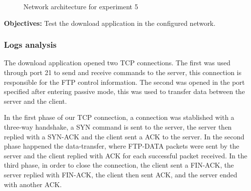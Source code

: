 \documentclass[a4paper, 11pt]{report}
\begin{document}
\begin{figure}[H]
	\caption{Network architecture for experiment 5}
	\label{fig:network_exp4}
\end{figure}

\textbf{Objectives:} Test the download application in the configured network.

\subsubsection{Logs analysis} \label{sec:Log6}

The download application opened two TCP connections. 
The first was used through port 21 to send and receive commands to the server, this connection is responsible for the FTP control information.
The second was opened in the port specified after entering passive mode, this was used to transfer data between the server and the client.

In the first phase of our TCP connection, a connection was stablished with a three-way handshake, a SYN command is sent to the server, the server then replied with a SYN-ACK and the client sent a ACK to the server.
In the second phase happened the data-transfer, where FTP-DATA packets were sent by the server and the client replied with ACK for each successful packet received.
In the third phase, in order to close the connection, the client sent a FIN-ACK, the server replied with FIN-ACK, the client then sent ACK, and the server ended with another ACK. 
\end{document}
